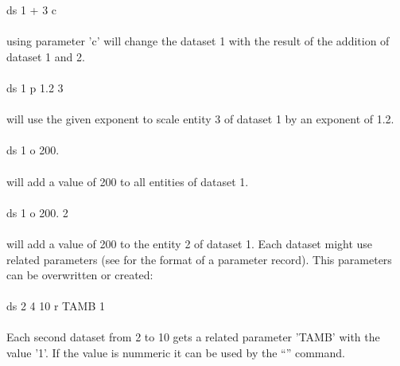 \documentclass{article}
\begin{document}
ds 1 + 3 c\\\\
using parameter 'c' will change the dataset 1 with the result of the addition of dataset 1 and 2. \\\\ 
ds 1 p 1.2 3\\\\
will use the given exponent to scale entity 3 of dataset 1 by an exponent of 1.2.\\\\
ds 1 o 200.\\\\
will add a value of 200 to all entities of dataset 1.\\\\
ds 1 o 200. 2\\\\
will add a value of 200 to the entity 2 of dataset 1.
Each dataset might use related parameters (see  for the format of a parameter record). This parameters can be overwritten or created:\\\\
ds 2 4 10 r TAMB 1\\\\
Each second dataset from 2 to 10 gets a related parameter 'TAMB' with the value '1'. If the value is nummeric it can be used by the ``'' command. 
\end{document}
